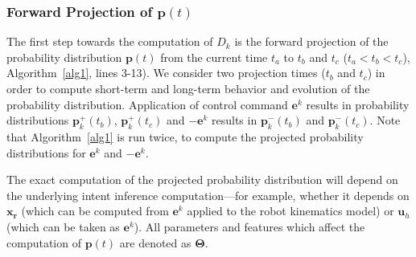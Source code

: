 \subsubsection{Forward Projection of $\boldsymbol{p}(t)$}\label{sssec:projection}
The first step towards the computation of $D_k$ is the forward projection of the probability distribution $\boldsymbol{p}(t)$ from the current time $t_a$ to $t_b$ and $t_c$ ($t_a < t_b < t_c$), Algorithm~\ref{alg1}, lines 3-13). We consider two projection times ($t_b$ and $t_c$) in order to compute short-term and long-term behavior and evolution of the probability distribution. Application of control command $\boldsymbol{e}^k$ results in probability distributions $\boldsymbol{p}^+_k(t_b)$, $\boldsymbol{p}^+_k(t_c)$ and $-\boldsymbol{e}^k$ results in $\boldsymbol{p}^-_k(t_b)$ and $\boldsymbol{p}^-_k(t_c)$. Note that Algorithm~\ref{alg1} is run twice, to compute the projected probability distributions for $\boldsymbol{e}^k$ and $-\boldsymbol{e}^k$.

 The exact computation of the projected probability distribution will depend on the underlying intent inference computation---for example, whether it depends on $\boldsymbol{x_r}$ (which can be computed from $\boldsymbol{e}^k$ applied to the robot kinematics model) or $\boldsymbol{u}_h$ (which can be taken as $\boldsymbol{e}^k$). All parameters and features which affect the computation of $\boldsymbol{p}(t)$ are denoted as $\boldsymbol{\Theta}$. 

